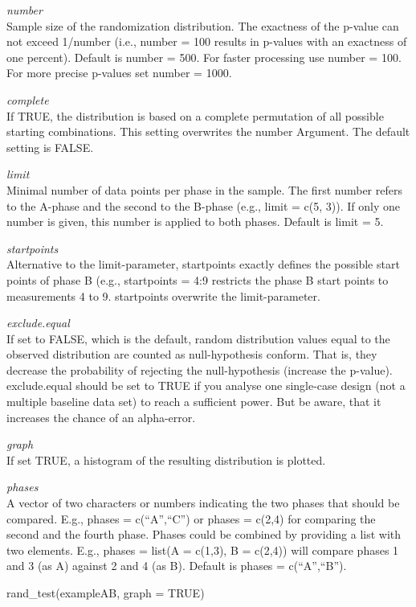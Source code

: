 \documentclass[
]{book}
\newenvironment{Shaded}{\begin{snugshade}}{\end{snugshade}}
\newcommand{\AttributeTok}[1]{\textcolor[rgb]{0.77,0.63,0.00}{#1}}
\newcommand{\ConstantTok}[1]{\textcolor[rgb]{0.00,0.00,0.00}{#1}}
\newcommand{\FunctionTok}[1]{\textcolor[rgb]{0.00,0.00,0.00}{#1}}
\newcommand{\NormalTok}[1]{#1}
\begin{document}
\emph{number}\\
Sample size of the randomization distribution. The exactness of the p-value can not exceed 1/number (i.e., number = 100 results in p-values with an exactness of one percent). Default is number = 500. For faster processing use number = 100. For more precise p-values set number = 1000.

\emph{complete}\\
If TRUE, the distribution is based on a complete permutation of all possible starting combinations. This setting overwrites the number Argument. The default setting is FALSE.

\emph{limit}\\
Minimal number of data points per phase in the sample. The first number refers to the A-phase and the second to the B-phase (e.g., limit = c(5, 3)). If only one number is given, this number is applied to both phases. Default is limit = 5.

\emph{startpoints}\\
Alternative to the limit-parameter, startpoints exactly defines the possible start points of phase B (e.g., startpoints = 4:9 restricts the phase B start points to measurements 4 to 9. startpoints overwrite the limit-parameter.

\emph{exclude.equal}\\
If set to FALSE, which is the default, random distribution values equal to the observed distribution are counted as null-hypothesis conform. That is, they decrease the probability of rejecting the null-hypothesis (increase the p-value). exclude.equal should be set to TRUE if you analyse one single-case design (not a multiple baseline data set) to reach a sufficient power. But be aware, that it increases the chance of an alpha-error.

\emph{graph}\\
If set TRUE, a histogram of the resulting distribution is plotted.

\emph{phases}\\
A vector of two characters or numbers indicating the two phases that should be compared. E.g., phases = c(``A'',``C'') or phases = c(2,4) for comparing the second and the fourth phase. Phases could be combined by providing a list with two elements. E.g., phases = list(A = c(1,3), B = c(2,4)) will compare phases 1 and 3 (as A) against 2 and 4 (as B). Default is phases = c(``A'',``B'').

\begin{Shaded}
\begin{Highlighting}[]
\FunctionTok{rand\_test}\NormalTok{(exampleAB, }\AttributeTok{graph =} \ConstantTok{TRUE}\NormalTok{)}
\end{Highlighting}
\end{Shaded}
\end{document}
